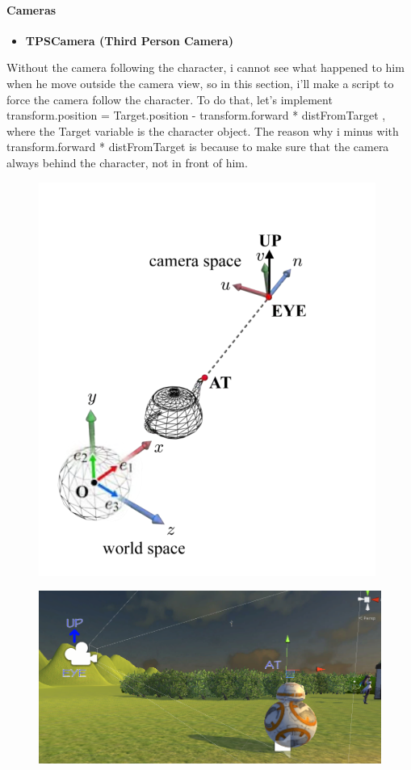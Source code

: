 \documentclass[a4paper, 13pt]{extarticle}
\begin{document}
 	 \paragraph{Cameras}
 	 \begin{itemize}
 	 	\item \bfseries TPSCamera (Third Person Camera) 
 	 \end{itemize}
 	 
 	 Without the camera following the character, i cannot see what happened to him when he move outside the camera view, so in this section, i'll make a script to force the camera follow the character. To do that, let's implement transform.position = Target.position - transform.forward * distFromTarget , where the Target variable is the character object. The reason why i minus with transform.forward * distFromTarget is because to make sure that the camera always behind the character, not in front of him. 
 	 \begin{figure}[h]
 	 	\centering
 	 	\begin{minipage}{.4\textwidth}
 	 		\centering
 	 		\includegraphics[width=0.7\linewidth]{intructions/camera_space.png}
 	 			\centering
 	 		\label{fig:test6}
 	 	\end{minipage}
  		\begin{minipage}{.4\textwidth}
  			\centering
  			\includegraphics[width=1.2\linewidth]{intructions/my_camera_space.png}
  			\label{fig:test7}
  		\end{minipage}
 	 \end{figure}  
\end{document}
